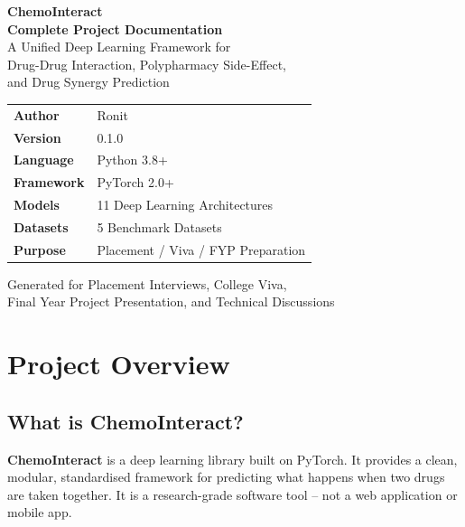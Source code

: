 \documentclass[12pt,a4paper,oneside]{book}
\begin{document}
\begin{titlepage}
\centering\vspace*{2cm}
{\Huge\bfseries\color{deepblue} ChemoInteract}\\[1cm]
{\LARGE\bfseries\color{chemopurple} Complete Project Documentation}\\[0.5cm]
{\large A Unified Deep Learning Framework for\\
Drug-Drug Interaction, Polypharmacy Side-Effect,\\
and Drug Synergy Prediction}\\[2cm]
\begin{tcolorbox}[enhanced,width=12cm,colback=deepblue!5,
  colframe=deepblue,boxrule=1.5pt,arc=8pt]
\centering
\begin{tabular}{ll}
\textbf{Author}    & Ronit \\
\textbf{Version}   & 0.1.0 \\
\textbf{Language}  & Python 3.8+ \\
\textbf{Framework} & PyTorch 2.0+ \\
\textbf{Models}    & 11 Deep Learning Architectures \\
\textbf{Datasets}  & 5 Benchmark Datasets \\
\textbf{Purpose}   & Placement / Viva / FYP Preparation \\
\end{tabular}
\end{tcolorbox}
\vfill
{\large\color{gray} Generated for Placement Interviews, College Viva,\\
Final Year Project Presentation, and Technical Discussions}
\end{titlepage}

\tableofcontents\newpage
\chapter{Project Overview}\label{chap:overview}

\section{What is ChemoInteract?}

\textbf{ChemoInteract} is a deep learning library built on PyTorch. It provides a clean, modular, standardised framework for predicting what happens when two drugs are taken together. It is a research-grade software tool -- not a web application or mobile app.
\end{document}
